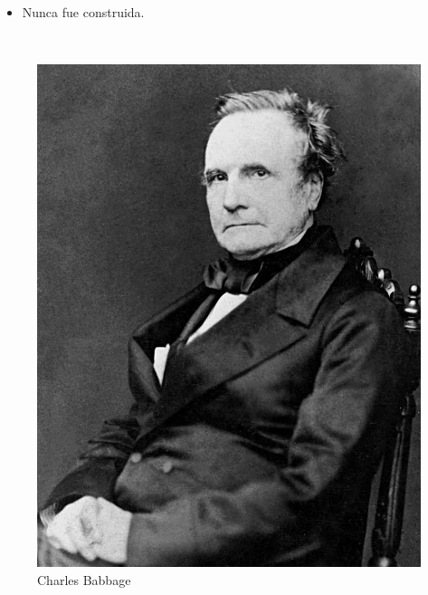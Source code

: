 \documentclass[11pt,a4paper,spanish]{beamer}
\begin{document}
\begin{frame}
\begin{minipage}{0.55\textwidth}
\begin{itemize}
        \item Nunca fue construida.
    \end{itemize}
\end{minipage}
~
\begin{minipage}{0.2\textwidth}
    \centering
    \begin{figure}
        \includegraphics[width=1.0\textwidth]{img/babbage.jpg}
        \captionsetup{textfont=tiny,labelformat=empty}
        \caption{Charles Babbage}
    \end{figure}
\end{minipage}

\end{frame}
\end{document}
